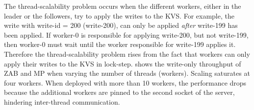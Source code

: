 \begin{comment}
Let's go through an example of the operation.
As in all \odlib~protocols, each node contains a number of worker threads.
Assume worker-0 of the leader pulls 100 writes from the clients.
Each write must be allocated a slot (write-id) in the total order. To achieve that, the worker fetches a global counter, that contains the highest write-id that has been allocated, and increments it by 100 (with an atomic fetch-and-add). Assume the counter was initially 200 and was modified to 300.
The worker tags each write with a unique write-id ranging from 200 to 300, and then broadcasts them all to the worker-0 of all followers. Each follower's worker-0 buffers the write and responds with a smart-ack (one ack for all 100 writes, described in \secref{sec:nw:sm}). Upon receiving a majority of the acks, leader's worker-0 broadcasts a smart-com (one commit for all 100 writes, also described in \secref{sec:nw:sm}).

\custvspace
Reads in ZAB are executed locally. Upon pulling a batch of reads, the worker propagates them to the KVS layer which directly responds to the client.
In MP, all reads must be sent to leader, to ensure linearizability.
Similarly to acks and commits, reads are also smart. The KVS stores a version number along with each key. The version number is updated on each write with the unique write-id.
A read request from a follower to the leader contains the key and the locally stored version. The leader replies with the value iff its stores a later version than the follower. Otherwise, it replies with a simple 1-byte opcode notifying the follower that its version is up to date.
\end{comment}


The thread-scalability problem occurs when the different workers, either in the leader or the followers, try to apply the writes to the KVS. For example, the write with write-id = 200 (\ie write-200), can only be applied \emph{after} write-199 has been applied. If worker-0 is responsible for applying write-200, but not write-199, then 
worker-0 must wait until the worker responsible for write-199 applies it.
Therefore the thread-scalability problem rises from the fact that workers can only apply their writes to the KVS in lock-step.  shows the write-only throughput of ZAB and MP when varying the number of threads (\ie workers). 
Scaling saturates at four workers.
When deployed with more than 10 workers, the performance drops because the additional workers are pinned to the second socket of the server, hindering inter-thread communication.




